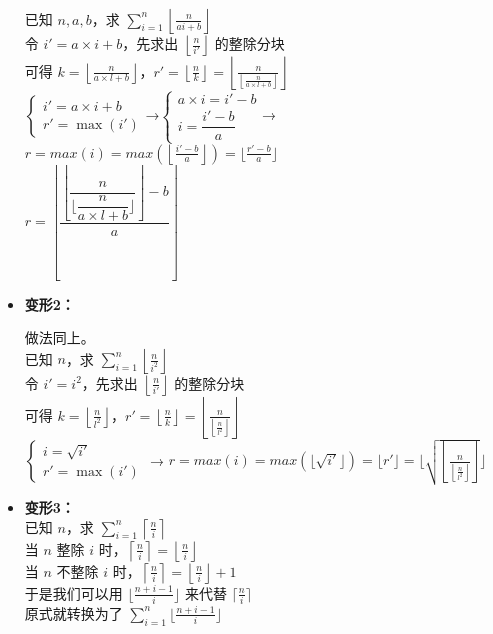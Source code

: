 \documentclass[E:/GsjzTle/main/main.tex]{subfiles}
\begin{document}
\begin{itemize}
  已知 \(n,a,b\)，求
  \(\sum_{i=1}^{n}\left\lfloor\frac{n}{a i+b}\right\rfloor\)\\
  令 \(i' = a\times i + b\)，先求出
  \(\left\lfloor\frac{n}{i'}\right\rfloor\) 的整除分块\\
  可得
  \(k=\left\lfloor\frac{n}{a\times l+b}\right\rfloor\)，\(r'=\left\lfloor\frac{n}{k}\right\rfloor=\left\lfloor\frac{n}{\left\lfloor\frac{n}{a \times l + b}\right\rfloor}\right\rfloor\)\\
  \(\left\{\begin{array}{l}i'=a\times i +b \\ r'=\max (i')\end{array}\right.\)→\(\begin{cases}a\times i=i'-b\\
  i=\dfrac{i'-b}{a}\end{cases}\)→
  \(r=max(i)= max(\left\lfloor\frac{i'-b}{a}\right\rfloor) = \lfloor\frac{r'-b}{a} \rfloor\)\\
  \(r =\left \lfloor \dfrac{\left \lfloor \dfrac{n}{\lfloor \dfrac{n}{a\times l+b}\rfloor }\right \rfloor -b}{a}\right \rfloor \)
\item
  \textbf{变形2：}

  做法同上。\\
  已知 \(n\)，求
  \(\sum_{i=1}^{n}\left\lfloor\frac{n}{i^2}\right\rfloor\)\\
  令 \(i' = i^2\)，先求出 \(\left\lfloor\frac{n}{i'}\right\rfloor\)
  的整除分块\\
  可得
  \(k=\left\lfloor\frac{n}{l^2}\right\rfloor\)，\(r'=\left\lfloor\frac{n}{k}\right\rfloor=\left\lfloor\frac{n}{\left\lfloor\frac{n}{l^2}\right\rfloor}\right\rfloor\)\\
  \(\left\{\begin{array}{l}i=\sqrt{i'} \\ r'=\max (i')\end{array}\right.\)
  →
  \(r = max(i) = max(\lfloor\sqrt{i'} \rfloor) = \lfloor r' \rfloor = \lfloor\sqrt{\left\lfloor\frac{n}{\left\lfloor\frac{n}{l^2}\right\rfloor}\right\rfloor}\rfloor\)
\item
  \textbf{变形3：}\\
  已知 \(n\)，求 \(\sum_{i=1}^{n}\left\lceil\frac{n}{i}\right\rceil\)\\
  当 \(n\) 整除 \(i\)
  时，\(\left\lceil\frac{n}{i}\right\rceil = \left\lfloor\frac{n}{i}\right\rfloor\)\\
  当 \(n\) 不整除 \(i\)
  时，\(\left\lceil\frac{n}{i}\right\rceil = \left\lfloor\frac{n}{i}\right\rfloor + 1\)\\
  于是我们可以用 \(\lfloor \frac{n+i-1}{i}\rfloor \) 来代替
  \(\lceil\frac{n}{i}\rceil\)\\
  原式就转换为了 \(\sum_{i=1}^{n}\lfloor\frac{n+i -1}{i}\rfloor\)


\end{itemize}
\end{document}
